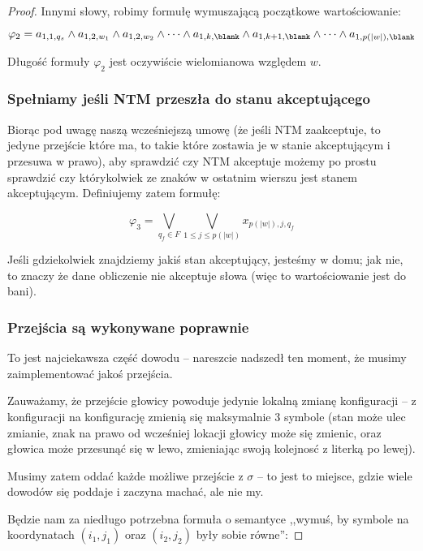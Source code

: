 \begin{proof}
        Innymi słowy, robimy formułę wymuszającą początkowe wartościowanie:
        
        \[
            \varphi_2 = a_{1,1, q_{s}} \land a_{1,2, w_1} \land a_{1,2, w_2} \land \dots \land a_{1, k, \blank} \land a_{1, k+1, \blank} \land \dots \land a_{1, p(|w|), \blank}
        \]
    
        Długość formuły \(\varphi_2\) jest oczywiście wielomianowa względem \(w\). 
    
    \subsubsection{Spełniamy jeśli NTM przeszła do stanu akceptującego}
        Biorąc pod uwagę naszą wcześniejszą umowę (że jeśli NTM zaakceptuje, to jedyne przejście które ma, to takie które zostawia je w stanie akceptującym i przesuwa w prawo), aby sprawdzić czy NTM akceptuje możemy po prostu sprawdzić czy którykolwiek ze znaków w ostatnim wierszu jest stanem akceptującym. Definiujemy zatem formułę:
        
        \[ 
            \varphi_3 = \bigvee_{q_f \in F } \bigvee_{1 \leq j \leq p(|w|)} x_{p(|w|), j, q_f}
        \]
        
        Jeśli gdziekolwiek znajdziemy jakiś stan akceptujący, jesteśmy w domu; jak nie, to znaczy że dane obliczenie nie akceptuje słowa (więc to wartościowanie jest do bani).
    
    \subsubsection{Przejścia są wykonywane poprawnie}
        To jest najciekawsza część dowodu -- nareszcie nadszedł ten moment, że musimy zaimplementować jakoś przejścia. 
        
        Zauważamy, że przejście głowicy powoduje jedynie lokalną zmianę konfiguracji -- z konfiguracji na konfigurację zmienią się maksymalnie 3 symbole (stan może ulec zmianie, znak na prawo od wcześniej lokacji głowicy może się zmienic, oraz głowica może przesunąć się w lewo, zmieniając swoją kolejnosć z literką po lewej).

        Musimy zatem oddać każde możliwe przejście z \( \sigma \) -- to jest to miejsce, gdzie wiele dowodów się poddaje i zaczyna machać, ale nie my. 
        
        Będzie nam za niedługo potrzebna formuła o semantyce ,,wymuś, by symbole na koordynatach \( (i_1, j_1) \) oraz \((i_2, j_2)\) były sobie równe'':
        

\end{proof}
